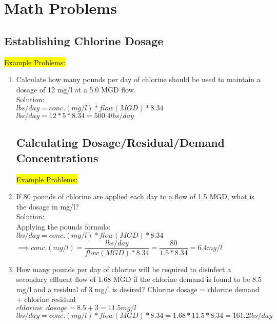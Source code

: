 \section{Math Problems}

\subsection{Establishing Chlorine Dosage}

\hl{Example Problems:}
\begin{enumerate}
\item Calculate how many pounds per day of chlorine should be used to maintain a dosage of 12 mg/l at a 5.0 MGD flow.\\
Solution:\\
$lbs/day=conc. (mg/l)*flow(MGD)*8.34$\\
$lbs/day=12*5*8.34=\boxed{500.4lbs/day}$\\

\subsection{Calculating Dosage/Residual/Demand Concentrations}

\hl{Example Problems:}
\item If 80 pounds of chlorine are applied each day to a flow of 1.5 MGD, what is the dosage in mg/l?\\
Solution:\\
Applying the pounds formula:\\  $lbs/day=conc. (mg/l)*flow(MGD)*8.34$\\
$\implies conc. (mg/l)=\dfrac{lbs/day}{flow(MGD)*8.34}=\dfrac{80}{1.5*8.34}=\boxed{6.4mg/l}$

\item How many pounds per day of chlorine will be required to disinfect a secondary effluent flow of 1.68 MGD if the chlorine demand is found to be 8.5 mg/l and a residual of 3 mg/l is desired?
Chlorine dosage = chlorine demand + chlorine residual\\
$chlorine \enspace dosage=8.5+3=11.5mg/l$\\
$lbs/day=conc. (mg/l)*flow(MGD)*8.34=1.68*11.5*8.34=\boxed{161.2lbs/day}$\\
\end{enumerate}

